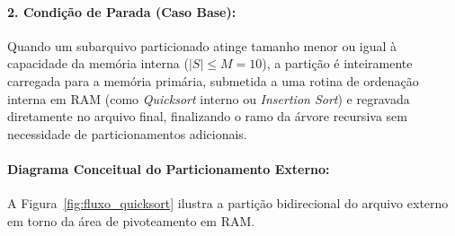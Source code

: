 \documentclass[12pt,a4paper]{article}
\begin{document}
\paragraph{2. Condição de Parada (Caso Base):}
Quando um subarquivo particionado atinge tamanho menor ou igual à capacidade da memória interna ($|S| \le M = 10$), a partição é inteiramente carregada para a memória primária, submetida a uma rotina de ordenação interna em RAM (como \textit{Quicksort} interno ou \textit{Insertion Sort}) e regravada diretamente no arquivo final, finalizando o ramo da árvore recursiva sem necessidade de particionamentos adicionais.

\paragraph{Diagrama Conceitual do Particionamento Externo:}
A Figura~\ref{fig:fluxo_quicksort} ilustra a partição bidirecional do arquivo externo em torno da área de pivoteamento em RAM.
\end{document}
